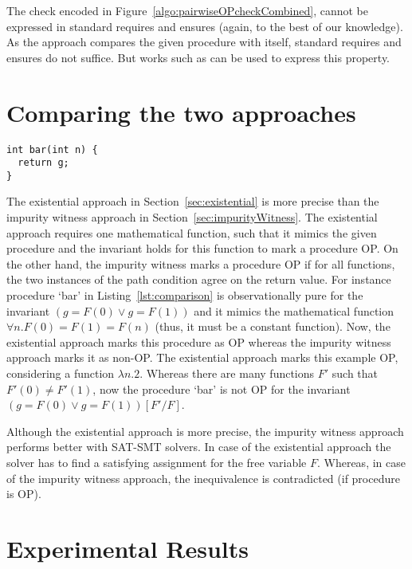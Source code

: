 \documentclass{llncs}
\newcommand{\F}{\mathit{F}}
\begin{document}
The check encoded in Figure~\ref{algo:pairwiseOPcheckCombined}, cannot
be expressed in standard requires and ensures (again, to the best of
our knowledge). As the approach compares the given procedure with
itself, standard requires and ensures do not suffice. But works such as
\cite{lahiri2013differential} can be used to express this property. 

\section{Comparing the two approaches}

\begin{lstlisting}[caption={Procedure `bar': illustrates that
      existential approach is more precise that the impurity witness
      approach.}, label=lst:comparison]
int bar(int n) { 
  return g; 
}
\end{lstlisting}

The existential approach in Section~\ref{sec:existential} is more
precise than the impurity witness approach in
Section~\ref{sec:impurityWitness}. The existential approach requires
one mathematical function, such that it mimics the given procedure and
the invariant holds for this function to mark a procedure OP. On the
other hand, the impurity witness marks a procedure OP if for all
functions, the two instances of the path condition agree on the return
value. For instance procedure `bar' in Listing~\ref{lst:comparison} is
observationally pure for the invariant $(g = \F(0) \vee g = \F(1))$
and it mimics the mathematical function $\forall n. \F(0) = \F(1) =
\F(n)$ (thus, it must be a constant function). Now, the existential
approach marks this procedure as OP whereas the impurity witness
approach marks it as non-OP. The existential approach marks this
example OP, considering a function $\lambda n. 2$. Whereas there are
many functions $\F'$ such that $\F'(0) \neq \F'(1)$, now the procedure
`bar' is not OP for the invariant $(g = \F(0) \vee g = \F(1))[\F'/\F]$.

Although the existential approach is more precise, the impurity
witness approach performs better with SAT-SMT solvers. In case of the
existential approach the solver has to find a satisfying assignment
for the free variable $\F$. Whereas, in case of the impurity witness
approach, the inequivalence is contradicted (if procedure is OP).

\section{Experimental Results}
\end{document}
